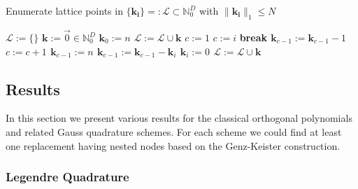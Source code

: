 \documentclass[a4paper,10pt]{article}
\begin{document}
\begin{algorithm}[h!]
  \caption{Enumerate lattice points in $\{\mathbf{k_{i}}\} =: \mathcal{L} \subset \mathbb{N}_{0}^{D}$
    with $\|\mathbf{k_{i}}\|_{1} \leq N$}
  \label{alg:ca_enumerate_lattice_points}
  \begin{algorithmic}
      \State $\mathcal{L} := \{\} $
        \State $\mathbf{k} := \vec{0} \in \mathbb{N}_{0}^{D}$
        \State $\mathbf{k}_{0} := n$
        \State $\mathcal{L} := \mathcal{L} \cup \mathbf{k}$
        \State $c := 1$
              \State $c := i$
                \State \bf{break}
              \EndIf
            \EndFor
            \State $\mathbf{k}_{c-1} := \mathbf{k}_{c-1} - 1$
            \State $c := c +1$
            \State $\mathbf{k}_{c-1} := n$
              \State $\mathbf{k}_{c-1} := \mathbf{k}_{c-1} - \mathbf{k}_{i}$
            \EndFor
                \State $\mathbf{k}_{i} := 0$
              \EndFor
            \EndIf
            \State $\mathcal{L} := \mathcal{L} \cup \mathbf{k}$
          \EndIf
        \EndWhile
      \EndFor
    \EndProcedure
  \end{algorithmic}
\end{algorithm}


\FloatBarrier
\subsection{Results}

In this section we present various results for the classical orthogonal polynomials
and related Gauss quadrature schemes. For each scheme we could find at least one
replacement having nested nodes based on the Genz-Keister construction.


\subsubsection{Legendre Quadrature}
\end{document}
